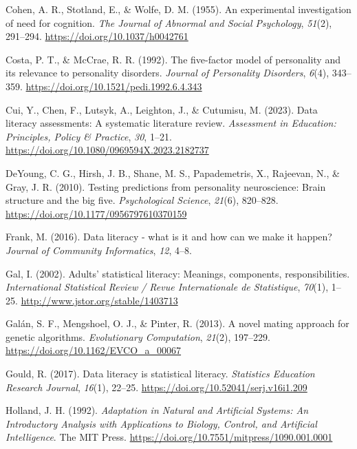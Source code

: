\documentclass[
  12pt,
  a4paper,
  twoside]{article}
\newlength{\cslhangindent}
\newenvironment{CSLReferences}[2] %
 {\begin{list}{}{%
  \setlength{\itemindent}{0pt}
  \setlength{\leftmargin}{0pt}
  \setlength{\parsep}{0pt}
  \ifodd #1
   \setlength{\leftmargin}{\cslhangindent}
   \setlength{\itemindent}{-1\cslhangindent}
  \fi
  \setlength{\itemsep}{#2\baselineskip}}}
 {\end{list}}
\begin{document}
\begin{CSLReferences}{1}{0}
Cohen, A. R., Stotland, E., \& Wolfe, D. M. (1955). An experimental investigation of need for cognition. \emph{The Journal of Abnormal and Social Psychology}, \emph{51}(2), 291--294. \url{https://doi.org/10.1037/h0042761}

Costa, P. T., \& McCrae, R. R. (1992). The five-factor model of personality and its relevance to personality disorders. \emph{Journal of Personality Disorders}, \emph{6}(4), 343--359. \url{https://doi.org/10.1521/pedi.1992.6.4.343}

Cui, Y., Chen, F., Lutsyk, A., Leighton, J., \& Cutumisu, M. (2023). Data literacy assessments: A systematic literature review. \emph{Assessment in Education: Principles, Policy \& Practice}, \emph{30}, 1--21. \url{https://doi.org/10.1080/0969594X.2023.2182737}

DeYoung, C. G., Hirsh, J. B., Shane, M. S., Papademetris, X., Rajeevan, N., \& Gray, J. R. (2010). Testing predictions from personality neuroscience: Brain structure and the big five. \emph{Psychological Science}, \emph{21}(6), 820--828. \url{https://doi.org/10.1177/0956797610370159}

Frank, M. (2016). Data literacy - what is it and how can we make it happen? \emph{Journal of Community Informatics}, \emph{12}, 4--8.

Gal, I. (2002). Adults' statistical literacy: Meanings, components, responsibilities. \emph{International Statistical Review / Revue Internationale de Statistique}, \emph{70}(1), 1--25. \url{http://www.jstor.org/stable/1403713}

Galán, S. F., Mengshoel, O. J., \& Pinter, R. (2013). A novel mating approach for genetic algorithms. \emph{Evolutionary Computation}, \emph{21}(2), 197--229. \url{https://doi.org/10.1162/EVCO_a_00067}

Gould, R. (2017). Data literacy is statistical literacy. \emph{Statistics Education Research Journal}, \emph{16}(1), 22--25. \url{https://doi.org/10.52041/serj.v16i1.209}

Holland, J. H. (1992). \emph{{Adaptation in Natural and Artificial Systems: An Introductory Analysis with Applications to Biology, Control, and Artificial Intelligence}}. The MIT Press. \url{https://doi.org/10.7551/mitpress/1090.001.0001}


\end{CSLReferences}
\end{document}
